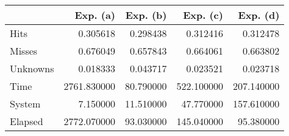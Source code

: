 \begin{tabular}{l|r|r|r|r}
         &    Exp. (a)  & Exp. (b)   & Exp. (c)    & Exp. (d)   \\\hline
Hits     &     0.305618 &   0.298438 &    0.312416 &    0.312478    \\\hline
Misses   &     0.676049 &   0.657843 &    0.664061 &    0.663802    \\\hline
Unknowns &     0.018333 &   0.043717 &    0.023521 &    0.023718    \\\hline
Time     &  2761.830000 &  80.790000 &  522.100000 &  207.140000    \\\hline
System   &     7.150000 &  11.510000 &   47.770000 &  157.610000    \\\hline
Elapsed  &  2772.070000 &  93.030000 &  145.040000 &   95.380000    
\end{tabular}
